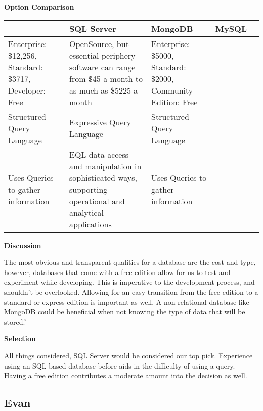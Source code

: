 \documentclass[letterpaper, 10pt, draftclsnofoot, compsoc, onecolumn]{IEEEtran}
\begin{document}
{\newpage
{\noindent\rmfamily\bfseries\color{black} Option Comparison \par}
\tablehead{}
\begin{supertabular}{|p{2cm}|p{2.5cm}|p{2.5cm}|p{2.5cm}|p{2.5cm}|}
\hline & SQL Server & MongoDB & MySQL\\ \hline
Enterprise: \$12,256, Standard: \$3717, Developer: Free & OpenSource, but essential periphery software can range from \$45 a month to as much as \$5225 a month & Enterprise: \$5000, Standard: \$2000, Community Edition: Free \\ \hline
\hline Structured Query Language & Expressive Query Language & Structured Query Language\\ \hline
\hline Uses Queries to gather information & EQL data access and manipulation in sophisticated ways, supporting operational and analytical applications \cite{ibmbpnetwork} & Uses Queries to gather information \\ \hline
\end{supertabular}

\newpage
{\noindent\rmfamily\bfseries\color{black} Discussion \par}
{\noindent The most obvious and transparent qualities for a database are the cost and type, however, databases that come with a free edition allow for us to test and experiment while developing. This is imperative to the development process, and shouldn't be overlooked. Allowing for an easy transition from the free edition to a standard or express edition is important as well. A non relational database like MongoDB could be beneficial when not knowing the type of data that will be stored.' \par}

\medskip
{\noindent\rmfamily\bfseries\color{black} Selection \par}
{\noindent All things considered, SQL Server would be considered our top pick. Experience using an SQL based database before aids in the difficulty of using a query. Having a free edition contributes a moderate amount into the decision as well.\par}

\medskip








\newpage
\subsection{Evan}
\vspace{1pc}
}
\end{document}

